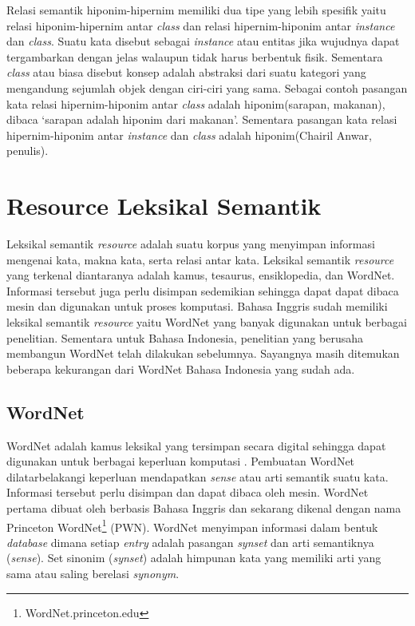 Relasi semantik hiponim-hipernim memiliki dua tipe yang lebih spesifik yaitu relasi hiponim-hipernim antar \textit{class} dan relasi hipernim-hiponim antar \textit{instance} dan \textit{class}. Suatu kata disebut sebagai \textit{instance} atau entitas jika wujudnya dapat tergambarkan dengan jelas walaupun tidak harus berbentuk fisik. Sementara \textit{class} atau biasa disebut konsep adalah abstraksi dari suatu kategori yang mengandung sejumlah objek dengan ciri-ciri yang sama. Sebagai contoh pasangan kata relasi hipernim-hiponim antar \textit{class} adalah hiponim(sarapan, makanan), dibaca `sarapan adalah hiponim dari makanan'. Sementara pasangan kata relasi hipernim-hiponim antar \textit{instance} dan \textit{class} adalah hiponim(Chairil Anwar, penulis).


\section{Resource Leksikal Semantik}
Leksikal semantik \textit{resource} adalah suatu korpus yang menyimpan informasi mengenai kata, makna kata, serta relasi antar kata. Leksikal semantik \textit{resource} yang terkenal diantaranya adalah kamus, tesaurus, ensiklopedia, dan WordNet. Informasi tersebut juga perlu disimpan sedemikian sehingga dapat dapat dibaca mesin dan digunakan untuk proses komputasi. Bahasa Inggris sudah memiliki leksikal semantik \textit{resource} yaitu WordNet yang banyak digunakan untuk berbagai penelitian. Sementara untuk Bahasa Indonesia, penelitian yang berusaha membangun WordNet telah dilakukan sebelumnya. Sayangnya masih ditemukan beberapa kekurangan dari WordNet Bahasa Indonesia yang sudah ada. 

\subsection{WordNet}
WordNet adalah kamus leksikal yang tersimpan secara digital sehingga dapat digunakan untuk berbagai keperluan komputasi \citep{miller1995wordnet}. Pembuatan WordNet dilatarbelakangi keperluan mendapatkan \textit{sense} atau arti semantik suatu kata. Informasi tersebut perlu disimpan dan dapat dibaca oleh mesin. WordNet pertama dibuat oleh \cite{miller1995wordnet} berbasis Bahasa Inggris dan sekarang dikenal dengan nama Princeton WordNet\footnote{WordNet.princeton.edu} (PWN). WordNet menyimpan informasi dalam bentuk \textit{database} dimana setiap \textit{entry} adalah pasangan \textit{synset} dan arti semantiknya (\textit{sense}). Set sinonim (\textit{synset}) adalah himpunan kata yang memiliki arti yang sama atau saling berelasi \textit{synonym}. 

